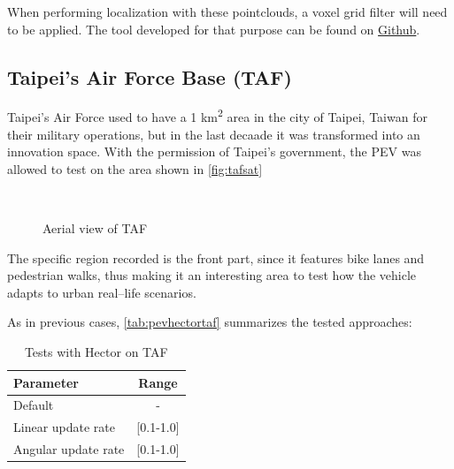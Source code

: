 When performing localization with these pointclouds, a voxel grid filter will need to be applied. The tool developed for that purpose can be found on \href{https://github.com/yagoliz/pcd_filter}{Github}.

\subsection{Taipei's Air Force Base (TAF)}
Taipei's Air Force used to have a 1 km\textsuperscript{2} area in the city of Taipei, Taiwan for their military operations, but in the last decaade it was transformed into an innovation space. With the permission of Taipei's government, the PEV was allowed to test on the area shown in \autoref{fig:tafsat}
\begin{figure}[h!]
  \centering
   \\
  \caption{Aerial view of TAF}
  \label{fig:tafsat}
\end{figure}

The specific region recorded is the front part, since it features bike lanes and pedestrian walks, thus making it an interesting area to test how the vehicle adapts to urban real--life scenarios.

 As in previous cases, \autoref{tab:pevhectortaf} summarizes the tested approaches:
\begin{table}[h!]
  \centering
  \begin{tabular}{lc}
    \hline
    \textbf{Parameter} & \textbf{Range} \\ \hline
    Default & - \\ \hline
    Linear update rate & {[}0.1-1.0{]} \\ \hline
    Angular update rate & {[}0.1-1.0{]} \\ \hline
  \end{tabular}
  \caption{Tests with Hector on TAF}
  \label{tab:pevhectortaf}
\end{table}

